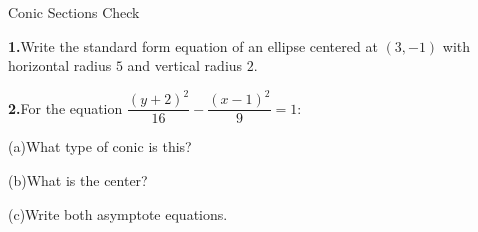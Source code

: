 \documentclass[10pt]{article}
\begin{document}
\namedateperiod

\vspace{0.12in}

\begin{notesbox}{Conic Sections Check}

\textbf{1.}\quad Write the standard form equation of an ellipse centered at
$(3, -1)$ with horizontal radius $5$ and vertical radius $2$.


\vspace{0.06in}

\textbf{2.}\quad For the equation $\dfrac{(y+2)^2}{16} - \dfrac{(x-1)^2}{9} = 1$:

\vspace{4pt}
(a)\quad What type of conic is this? \writeline

(b)\quad What is the center? \writeline

(c)\quad Write both asymptote equations.


\end{notesbox}
\end{document}
